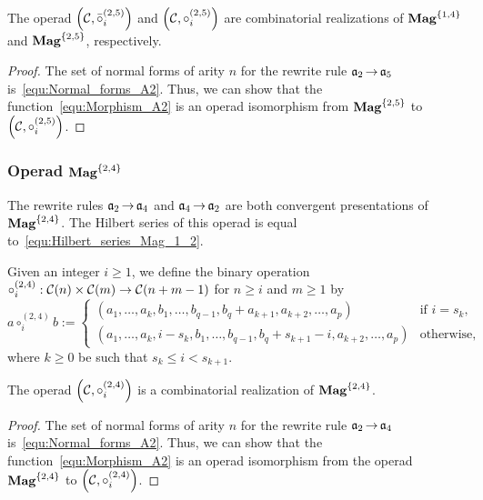 \begin{Proposition} \label{prop:Realisation_Mag_1_4}
  The operad $\left(\mathcal{C}, \bar{\circ}_i^{(2,5)}\right)$ and
  $\left(\mathcal{C}, \circ_i^{(2,5)}\right)$
  are combinatorial realizations of $\mathbf{Mag}^{\{1, 4\}}$ and
  $\mathbf{Mag}^{\{2, 5\}}$, respectively.
\end{Proposition}

\begin{proof}
  The set of normal forms of arity $n$ for the rewrite rule
  $\mathfrak{a}_2 \operatorname{\to} \mathfrak{a}_5$ is~\eqref{equ:Normal_forms_A2}. Thus, we can show
  that the function~\eqref{equ:Morphism_A2} is an operad isomorphism from
  $\mathbf{Mag}^{\{2, 5\}}$ to $\left(\mathcal{C}, \circ_i^{(2,5)}\right)$.
\end{proof}
\medbreak

\subsubsection{Operad $\mathbf{Mag}^{\{2, 4\}}$}
The rewrite rules $\mathfrak{a}_2 \operatorname{\to} \mathfrak{a}_4$ and $\mathfrak{a}_4 \operatorname{\to} \mathfrak{a}_2$ are both
convergent presentations of $\mathbf{Mag}^{\{2, 4\}}$. The Hilbert series of
this operad is equal to~\eqref{equ:Hilbert_series_Mag_1_2}.
\medbreak

Given an integer $i \geq 1$, we define the
binary operation
$\circ_i^{(2,4)} : \mathcal{C}(n) \times \mathcal{C}(m)\rightarrow
 \mathcal{C}(n + m - 1)$ for
$n \geq i$ and $m \geq 1$ by
\begin{equation}
    a \circ_i^{(2,4)} b :=
    \begin{cases}
    (a_1, \dots, a_{k}, b_1, \dots, b_{q-1}, b_{q} + a_{k+1},
    a_{k+2}, \dots ,a_{p}) & \mbox{if } i = s_k, \\
    (a_1, \dots, a_{k}, i - s_{k}, b_1, \dots, b_{q-1}, b_{q}
     + s_{k+1} - i, a_{k+2}, \dots ,a_{p}) & \mbox{otherwise},
    \end{cases}
\end{equation}
where $k \geq 0$  be such that $s_k \leq i < s_{k+1}$.
\medbreak

\begin{Proposition} \label{prop:Realisation_Mag_2_4}
  The operad $\left(\mathcal{C}, \circ_i^{(2,4)}\right)$
  is a combinatorial realization of $\mathbf{Mag}^{\{2, 4\}}$.
\end{Proposition}

\begin{proof}
  The set of normal forms of arity $n$ for the rewrite rule
  $\mathfrak{a}_2 \operatorname{\to} \mathfrak{a}_4$ is~\eqref{equ:Normal_forms_A2}. Thus, we can show
  that the function~\eqref{equ:Morphism_A2} is an operad isomorphism from
  the operad $\mathbf{Mag}^{\{2, 4\}}$ to
  $\left(\mathcal{C}, \circ_i^{(2,4)}\right)$.
\end{proof}
\medbreak

